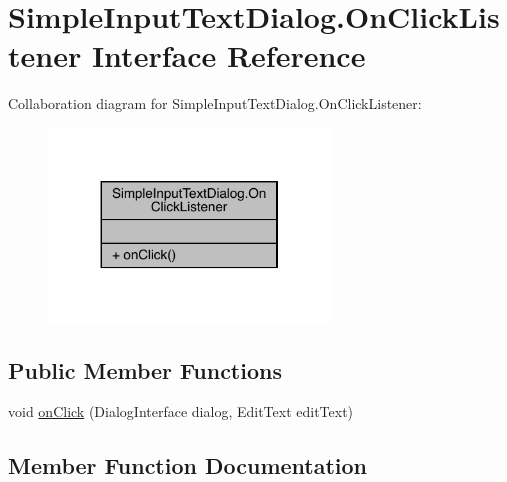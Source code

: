 \hypertarget{interfacecom_1_1toast_1_1android_1_1gamebase_1_1base_1_1ui_1_1_simple_input_text_dialog_1_1_on_click_listener}{}\section{Simple\+Input\+Text\+Dialog.\+On\+Click\+Listener Interface Reference}
\label{interfacecom_1_1toast_1_1android_1_1gamebase_1_1base_1_1ui_1_1_simple_input_text_dialog_1_1_on_click_listener}


Collaboration diagram for Simple\+Input\+Text\+Dialog.\+On\+Click\+Listener\+:
\nopagebreak
\begin{figure}[H]
\begin{center}
\leavevmode
\includegraphics[width=212pt]{interfacecom_1_1toast_1_1android_1_1gamebase_1_1base_1_1ui_1_1_simple_input_text_dialog_1_1_on_click_listener__coll__graph}
\end{center}
\end{figure}
\subsection*{Public Member Functions}
\begin{DoxyCompactItemize}
\item 
void \hyperlink{interfacecom_1_1toast_1_1android_1_1gamebase_1_1base_1_1ui_1_1_simple_input_text_dialog_1_1_on_click_listener_a8f1e820ffcfe747ab5b068ba89099303}{on\+Click} (Dialog\+Interface dialog, Edit\+Text edit\+Text)
\end{DoxyCompactItemize}


\subsection{Member Function Documentation}
\mbox{\label{interfacecom_1_1toast_1_1android_1_1gamebase_1_1base_1_1ui_1_1_simple_input_text_dialog_1_1_on_click_listener_a8f1e820ffcfe747ab5b068ba89099303}} 
